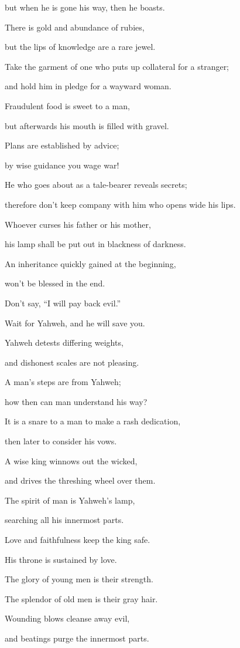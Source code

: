 {\par }{\QB but when he is gone his way, then he boasts.
\par }{\Q {}There is gold and abundance of rubies,
\par }{\QB but the lips of knowledge are a rare jewel.
\par }{\Q {}Take the garment of one who puts up collateral for a stranger;
\par }{\QB and hold him in pledge for a wayward woman.
\par }{\Q {}Fraudulent food is sweet to a man,
\par }{\QB but afterwards his mouth is filled with gravel.
\par }{\Q {}Plans are established by advice;
\par }{\QB by wise guidance you wage war!
\par }{\Q {}He who goes about as a tale-bearer reveals secrets;
\par }{\QB therefore don’t keep company with him who opens wide his lips.
\par }{\Q {}Whoever curses his father or his mother,
\par }{\QB his lamp shall be put out in blackness of darkness.
\par }{\Q {}An inheritance quickly gained at the beginning,
\par }{\QB won’t be blessed in the end.
\par }{\Q {}Don’t say, “I will pay back evil.”
\par }{\QB Wait for Yahweh, and he will save you.
\par }{\Q {}Yahweh detests differing weights,
\par }{\QB and dishonest scales are not pleasing.
\par }{\Q {}A man’s steps are from Yahweh;
\par }{\QB how then can man understand his way?
\par }{\Q {}It is a snare to a man to make a rash dedication,
\par }{\QB then later to consider his vows.
\par }{\Q {}A wise king winnows out the wicked,
\par }{\QB and drives the threshing wheel over them.
\par }{\Q {}The spirit of man is Yahweh’s lamp,
\par }{\QB searching all his innermost parts.
\par }{\Q {}Love and faithfulness keep the king safe.
\par }{\QB His throne is sustained by love.
\par }{\Q {}The glory of young men is their strength.
\par }{\QB The splendor of old men is their gray hair.
\par }{\Q {}Wounding blows cleanse away evil,
\par }{\QB and beatings purge the innermost parts.
\par }{\BB \par }
